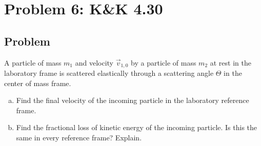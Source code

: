 \documentclass[solutions]{esg8012pset}
\begin{document}
\section*{Problem 6: K\&K 4.30}
\subsection*{Problem}
  A particle of mass $m_1$ and velocity $\vec v_{1,0}$ by a particle of mass $m_2$ at rest in the laboratory frame is scattered elastically through a scattering angle $\Theta$ in the center of mass frame.
  \begin{enumerate}[(a)]
    \item Find the final velocity of the incoming particle in the laboratory reference frame.
    \item Find the fractional loss of kinetic energy of the incoming particle. Is this the same in every reference frame? Explain.
  \end{enumerate}
\end{document}
